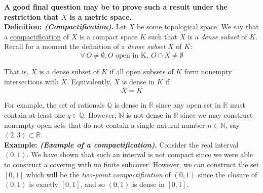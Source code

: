 \documentclass[12pt]{article}
\newlength\tindent
\renewcommand{\indent}{\hspace*{\tindent}}
\newcommand{\R}{\mathbb R}
\newcommand{\N}{\mathbb N}
\newcommand{\Q}{\mathbb Q}
\begin{document}
{\bf A good final question may be to prove such a result under the restriction that $X$ is a metric space.} \\

%
%
{\bf Definition: {\em (Compactification)}.} Let $X$ be some topological space. We say that a \underline{compactification} of $X$ is a compact space $K$ such that $X$ is a {\em dense subset} of $K$. \\

Recall for a moment the definition of a {\em dense subset} $X$ of $K$:
\begin{equation*}
	\forall\, O\neq \emptyset, O \text{ open in K},~O \cap X \neq \emptyset
\end{equation*}

\indent That is, $X$ is a dense subset of $K$ if all open subsets of $K$ form nonempty intersections with $X$. Equivalently, $X$ is dense in $K$ if
\begin{equation*}
	\overline{X} = K
\end{equation*}

\indent For example, the set of rationals $\Q$ is dense in $\R$ since any open set in $\R$ must contain at least one $q \in \Q$. However, $\N$ is not dense in $\R$ since we may construct nonempty open sets that do not contain a single natural number $n \in \N$, say $(2,3) \subset \R$. \\

%
%
{\bf Example: {\em (Example of a compactification)}.} Consider the real interval $(0, 1)$. We have shown that such an interval is not compact since we were able to construct a covering with no finite subcover. However, we can construct the set $[0,1]$ which will be the {\em two-point compactification} of $(0,1)$ since the closure of $(0,1)$ is exactly $[0,1]$, and so $(0,1)$ is dense in $[0,1]$.
\end{document}

